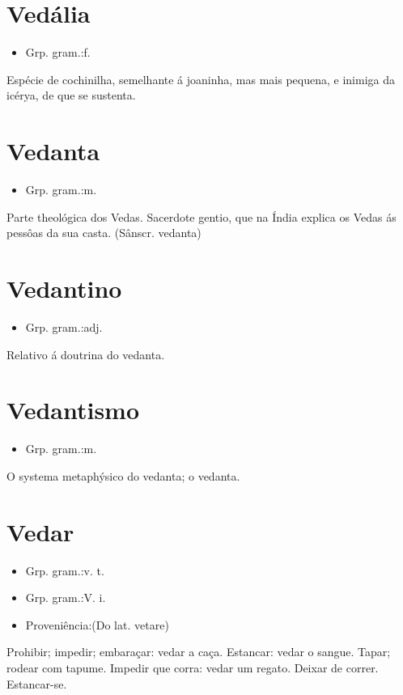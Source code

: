 \documentclass{article}
\begin{document}
\section{Vedália}
\begin{itemize}
\item {Grp. gram.:f.}
\end{itemize}
Espécie de cochinilha, semelhante á joaninha, mas mais pequena, e inimiga da icérya, de que se sustenta.
\section{Vedanta}
\begin{itemize}
\item {Grp. gram.:m.}
\end{itemize}
Parte theológica dos Vedas.
Sacerdote gentio, que na Índia explica os Vedas ás pessôas da sua casta.
(Sânscr. \textunderscore vedanta\textunderscore )
\section{Vedantino}
\begin{itemize}
\item {Grp. gram.:adj.}
\end{itemize}
Relativo á doutrina do vedanta.
\section{Vedantismo}
\begin{itemize}
\item {Grp. gram.:m.}
\end{itemize}
O systema metaphýsico do vedanta; o vedanta.
\section{Vedar}
\begin{itemize}
\item {Grp. gram.:v. t.}
\end{itemize}
\begin{itemize}
\item {Grp. gram.:V. i.}
\end{itemize}
\begin{itemize}
\item {Proveniência:(Do lat. \textunderscore vetare\textunderscore )}
\end{itemize}
Prohibir; impedir; embaraçar: \textunderscore vedar a caça\textunderscore .
Estancar: \textunderscore vedar o sangue\textunderscore .
Tapar; rodear com tapume.
Impedir que corra: \textunderscore vedar um regato\textunderscore .
Deixar de correr.
Estancar-se.
\end{document}
